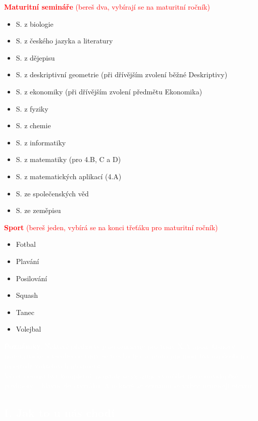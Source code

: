 \documentclass[a5paper, twoside]{article}
\newcommand{\polonadpis}[4]{
  \vspace*{-50pt}
  \begin{tcolorbox}[colback = #2, boxrule = 0pt, grow to left by = #4,  grow to right by = #4, arc=8pt, height = 30pt]
    \vspace*{5pt}
    \centering \subsection*{\textcolor{#3}{#1}}
  \end{tcolorbox}
}
\begin{document}
\begin{multicols}{2}
	\noindent \textcolor{red}{\textbf{Maturitní semináře} (bereš dva, vybírají se na maturitní ročník)}
	\begin{itemize}
		\item S. z biologie
		\item S. z českého jazyka a literatury
		\item S. z dějepisu
		\item S. z deskriptivní geometrie (při
		      dřívějším zvolení běžné Deskriptivy)
		\item S. z ekonomiky (při dřívějším zvolení předmětu Ekonomika)
		\item S. z fyziky
		\item S. z chemie
		\item S. z informatiky
		\item S. z matematiky (pro 4.B, C a D)
		\item S. z matematických aplikací (4.A)
		\item S. ze společenských věd
		\item S. ze zeměpisu
	\end{itemize}

	\noindent \textcolor{red}{\textbf{Sport} (bereš jeden, vybírá se na konci třeťáku pro maturitní ročník)}
	\begin{itemize}
		\item Fotbal
		\item Plavání
		\item Posilování
		\item Squash
		\item Tanec
		\item Volejbal
	\end{itemize}

	\begin{tcolorbox}[colback=red,boxrule=0pt, sharp corners]
		\textcolor{white}{\footnotesize \textbf{Poznámky.}
			Některé předměty jsou označeny pro třídy X.A apod. Osnovy matematické a všeobecné třídy se trochu liší, a proto jim musí být
			uzpůsoben i repertoár volitelných předmětů.\\
			Výčet nemusí být kompletní:
			neustále se snažíme vymýšlet nové smysluplné
			předměty -- hlavně do čtvrťáku. A některé ze
			seznamu se vůbec nemusejí otevřít.
      }

		\hfill
	\end{tcolorbox}
\end{multicols}

\newpage

\polonadpis{I. Jak to u nás chodí}{red}{white}{-4.1cm}
\end{document}
